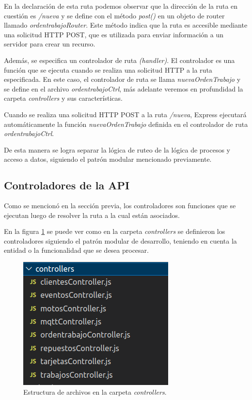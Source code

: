 En la declaración de esta ruta podemos observar que la dirección de la ruta en cuestión es \textit{/nueva} y se define con el método \textit{post()} en un objeto de router llamado \textit{ordentrabajoRouter}. Este método indica que la ruta es accesible mediante una solicitud HTTP POST, que es utilizada para enviar información a un servidor para crear un recurso.

Además, se especifica un controlador de ruta \textit{(handler)}. El controlador es una función que se ejecuta cuando se realiza una solicitud HTTP a la ruta especificada. En este caso, el controlador de ruta se llama \textit{nuevaOrdenTrabajo} y se define en el archivo \textit{ordentrabajoCtrl}, más adelante veremos en profundidad la carpeta \textit{controllers} y sus características.

Cuando se realiza una solicitud HTTP POST a la ruta \textit{/nueva}, Express ejecutará automáticamente la función \textit{nuevaOrdenTrabajo} definida en el controlador de ruta \textit{ordentrabajoCtrl}.

De esta manera se logra separar la lógica de ruteo de la lógica de procesos y acceso a datos, siguiendo el patrón modular mencionado previamente.

\subsection{Controladores de la API}
\label{subsec:apicontrollers}

Como se mencionó en la sección previa, los controladores son funciones que se ejecutan luego de resolver la ruta a la cual están asociados. 

En la figura \ref{fig:apicontrollers} se puede ver como en la carpeta \textit{controllers} se definieron los controladores siguiendo el patrón modular de desarrollo, teniendo en cuenta la entidad o la funcionalidad que se desea procesar.

\begin{figure}[ht]
	\centering
	\includegraphics[scale=.50]{./Figures/api-controllers.png}
	\caption{Estructura de archivos en la carpeta \textit{controllers}.}
	\label{fig:apicontrollers}
	
\end{figure}

